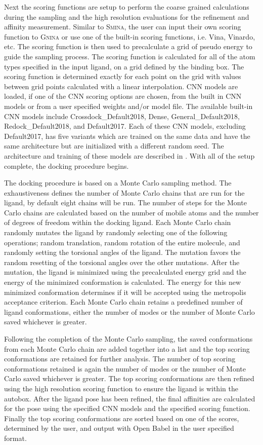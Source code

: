 \documentclass[journal=jcisd8,manuscript=article]{achemso}
\begin{document}
Next the scoring functions are setup to perform the coarse grained calculations during the sampling and the high resolution evaluations for the refinement and affinity measurement. Similar to \textsc{Smina}, the user can input their own scoring function to \textsc{Gnina} or use one of the built-in scoring functions, i.e. Vina, Vinardo, etc. The scoring function is then used to precalculate a grid of pseudo energy to guide the sampling process. The scoring function is calculated for all of the atom types specified in the input ligand, on a grid defined by the binding box. The scoring function is determined exactly for each point on the grid with values between grid points calculated with a linear interpolation. CNN models are loaded, if one of the CNN scoring options are chosen, from the built in CNN models or from a user specified weights and/or model file. The available built-in CNN models include Crossdock\_Default2018, Dense, General\_Default2018, Redock\_Default2018, and Default2017. Each of these CNN models, excluding Default2017, has five variants which are trained on the same data and have the same architecture but are initialized with a different random seed. The architecture and training of these models are described in \cite{francoeur2020three,Ragoza2017}. With all of the setup complete, the docking procedure begins.

The docking procedure is based on a Monte Carlo sampling method. The exhaustiveness defines the number of Monte Carlo chains that are run for the ligand, by default eight chains will be run. The number of steps for the Monte Carlo chains are calculated based on the number of mobile atoms and the number of degrees of freedom within the docking ligand. Each Monte Carlo chain randomly mutates the ligand by randomly selecting one of the following operations; random translation, random rotation of the entire molecule, and randomly setting the torsional angles of the ligand. The mutation favors the random resetting of the torsional angles over the other mutations. After the mutation, the ligand is minimized using the precalculated energy grid and the energy of the minimized conformation is calculated. The energy for this new minimized conformation determines if it will be accepted using the metropolis acceptance criterion. Each Monte Carlo chain retains a predefined number of ligand conformations, either the number of modes or the number of Monte Carlo saved whichever is greater.

Following the completion of the Monte Carlo sampling, the saved conformations from each Monte Carlo chain are added together into a list and the top scoring conformations are retained for further analysis. The number of top scoring conformations retained is again the number of modes or the number of Monte Carlo saved whichever is greater. The top scoring conformations are then refined using the high resolution scoring function to ensure the ligand is within the autobox. After the ligand pose has been refined, the final affinities are calculated for the pose using the specified CNN models and the specified scoring function. Finally the top scoring conformations are sorted based on one of the scores, determined by the user, and output with Open Babel in the user specified format.
\end{document}

